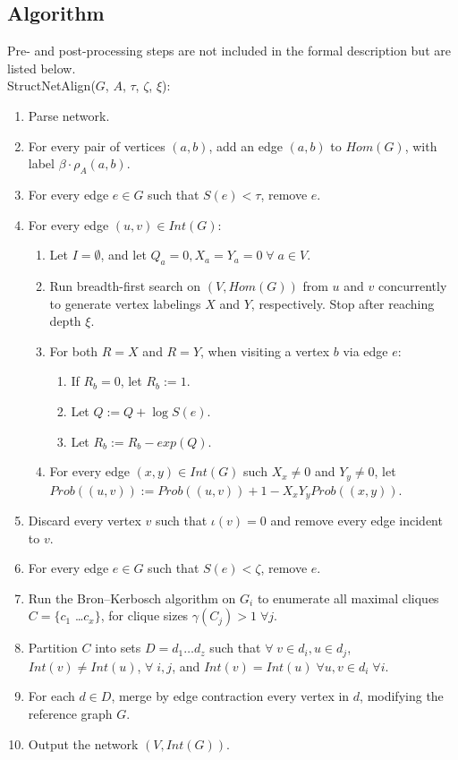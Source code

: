 \documentclass[12pt,twoside]{article}
\def\NS{
	\setlength{\itemsep}{0.1em}
	\setlength{\parskip}{0em}
	\setlength{\parsep}{0em}
}
\begin{document}
\subsection{Algorithm}

Pre- and post-processing steps are not included in the formal description but are listed below.\\
StructNetAlign($G$, $A$, $\tau$, $\zeta$, $\xi$):

\begin{enumerate}
\NS
\item Parse network.
\item For every pair of vertices $(a,b)$, add an edge $(a,b)$ to $Hom(G)$, with label $\beta \cdot \rho_{A}(a,b)$.
\item For every edge $e \in G$ such that $S(e) < \tau$, remove $e$.
\item For every edge $(u,v) \in Int(G)$:
\begin{enumerate}
\item Let $I=\emptyset$, and let $Q_a = 0, X_a = Y_a = 0 \; \forall \; a \in V$.
\item Run breadth-first search on $(V, Hom(G))$ from $u$ and $v$ concurrently to generate vertex labelings $X$ and $Y$, respectively. Stop after reaching depth $\xi$.
\item For both $R=X$ and $R=Y$, when visiting a vertex $b$ via edge $e$:
\begin{enumerate}
\item If $R_b=0$, let $R_b := 1$.
\item Let $Q := Q + \log S(e)$.
\item Let $R_b := R_b - exp(Q)$.
\end{enumerate}
\item For every edge $(x,y) \in Int(G)$ such $X_x \neq 0$ and $Y_y \neq 0$, let $Prob((u,v)) := Prob((u,v)) + 1 - X_x Y_y Prob((x,y))$.
\end{enumerate}
\item Discard every vertex $v$ such that $\iota(v) = 0$ and remove every edge incident to $v$.
\item For every edge $e \in G$ such that $S(e) < \zeta$, remove $e$.
\item Run the Bron--Kerbosch algorithm on $G_i$ to enumerate all maximal cliques $C = \{ c_1$ \ldots $c_x \}$, for clique sizes $\gamma(C_j) > 1 \; \forall j$.
\item Partition $C$ into sets $D = d_1 \ldots d_z$ such that $\forall \; v \in d_i, u \in d_j$, $Int(v) \neq Int(u)$, $\forall \; i,j$, and $Int(v) = Int(u) \; \forall u,v \in d_i \; \forall i$.
\item For each $d \in D$, merge by edge contraction every vertex in $d$, modifying the reference graph $G$.
\item Output the network $(V, Int(G))$.
\end{enumerate}
\end{document}
